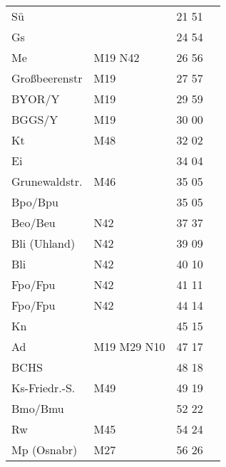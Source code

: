 \begin{tabular}{!{\color{schiefergrau}\vrule width 3pt}*{4}{l!{\color{schiefergrau}\vrule width 3pt}}}
Sü           &                                             & 21 51 &       \\
Gs           &                                             & 24 54 &       \\
Me           & \nusechs{} \mbus{} M19 \nbus{} N42          & 26 56 &       \\
Großbeerenstr& \mbus{} M19                                 & 27 57 &       \\
BYOR/Y       & \mbus{} M19                                 & 29 59 &       \\
BGGS/Y       & \mbus{} M19                                 & 30 00 &       \\
Kt           & \mbus{} M48                                 & 32 02 &       \\
Ei           &                                             & 34 04 &       \\
Grunewaldstr.& \mbus{} M46                                 & 35 05 &       \\
Bpo/Bpu      &                                             & 35 05 &       \\
Beo/Beu      & \nuneun{} \nbus{} N42                       & 37 37 &       \\
Bli (Uhland) & \nbus{} N42                                 & 39 09 &       \\
Bli          & \nbus{} N42                                 & 40 10 &       \\
Fpo/Fpu      & \nudrei{} \nbus{} N42                       & 41 11 &       \\
\hline
Fpo/Fpu      & \nudrei{} \nbus{} N42                       & 44 14 &       \\
Kn           &                                             & 45 15 &       \\
Ad           & \mbus{} M19 M29 \nbus{} N10                 & 47 17 &       \\
BCHS         &                                             & 48 18 &       \\
Ks-Friedr.-S.& \mbus{} M49                                 & 49 19 &       \\
Bmo/Bmu      & \nuzwei{}                                   & 52 22 &       \\
Rw           & \mbus{} M45                                 & 54 24 &       \\
Mp (Osnabr)  & \mbus{} M27                                 & 56 26 &       \\

\end{tabular}
